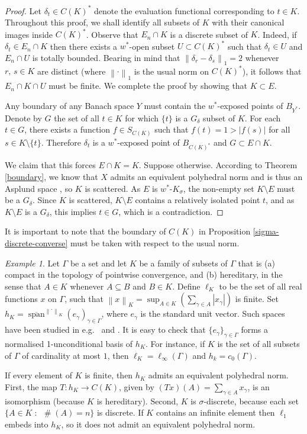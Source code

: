 \documentclass[12pt,a4paper]{amsart}
\theoremstyle{definition}
\theoremstyle{remark}
\newtheorem{example}[theorem]{Example}
\DeclareMathOperator{\card}{\#}
\DeclareMathOperator{\s}{span}
\newcommand{\cl}[1]{\ensuremath{\overline{{#1}}}}
\newcommand{\Ksig}{\ensuremath{K_\sigma}}
\newcommand{\n}[1]{\ensuremath{\left\|{#1}\right\|}}
\newcommand{\ndot}{\ensuremath{\left\|\cdot\right\|}}
\newcommand{\set}[2]{\{{#1} \;:\;\, {#2}\}}
\begin{document}
\begin{proof}
Let $\delta_t \in C(K)^*$ denote the evaluation functional corresponding
to $t \in K$. Throughout this proof, we shall identify all subsets of $K$
with their canonical images inside $C(K)^*$. Observe that $E_n \cap K$
is a discrete subset of $K$. Indeed, if $\delta_t \in E_n \cap K$ then there
exists a $w^*$-open subset $U \subset C(K)^*$ such that $\delta_t \in U$
and $E_n \cap U$ is totally bounded. Bearing in mind that $\n{\delta_r-\delta_s}_1 = 2$
whenever $r,\,s \in K$ are distinct (where $\ndot_1$ is the usual norm on $C(K)^*$),
it follows that $E_n \cap K \cap U$ must be finite. We complete the proof
by showing that $K \subset E$.

Any boundary of any Banach space $Y$ must contain the $w^*$-exposed
points of $B_{Y^*}$. Denote by $G$ the set of all $t \in K$ for
which $\{t\}$ is a $G_\delta$ subset of $K$. For each $t \in G$, there exists
a function $f \in S_{C(K)}$ such that $f(t)=1 > |f(s)|$ for all $s \in K\setminus\{t\}$.
Therefore $\delta_t$ is a $w^*$-exposed point of $B_{C(K)^*}$
and $G \subset E \cap K$.

We claim that this forces $E \cap K = K$. Suppose otherwise. According to
Theorem \ref{boundary}, we know that $X$ admits an equivalent
polyhedral norm and is thus an Asplund space \cite{fonf2}, so $K$ is scattered.
As $E$ is $w^*$-$\Ksig$, the non-empty set $K\setminus E$
must be a $G_\delta$. Since $K$ is scattered, $K\setminus E$ contains a
relatively isolated point $t$, and as $K\setminus E$ is a $G_\delta$, this
implies $t \in G$, which is a contradiction.
\end{proof}

It is important to note that the boundary of $C(K)$ in Proposition
\ref{sigma-discrete-converse} must be taken with respect to the usual norm.

\begin{example}
Let $\Gamma$ be a set and let $K$ be a family of subsets of $\Gamma$
that is (a) compact in the topology of pointwise convergence, and
(b) hereditary, in the sense that $A \in K$ whenever $A \subseteq B$
and $B \in K$. Define $\ell_K$ to be the set of all real functions
$x$ on $\Gamma$, such that $\n{x}_K = \sup_{A \in K}
\left(\sum_{\gamma \in A} |x_\gamma|\right)$ is finite. Set $h_K =
\cl{\s}^{\ndot_K}(e_\gamma)_{\gamma \in \Gamma}$, where $e_\gamma$
is the standard unit vector. Such spaces have been studied in e.g.\
\cite{am:93} and \cite{st:09}. It is easy to check that
$\{e_\gamma\}_{\gamma\in \Gamma}$ forms a normalised 1-unconditional
basis of $h_K$. For instance, if $K$ is the set of all subsets of
$\Gamma$ of cardinality at most $1$, then $\ell_K =
\ell_\infty(\Gamma)$ and $h_k = c_0(\Gamma)$.

If every element of $K$ is finite, then $h_K$ admits an equivalent
polyhedral norm. First, the map $T:h_K \to C(K)$, given by $(Tx)(A)
= \sum_{\gamma \in A} x_\gamma$, is an isomorphism (because $K$ is
hereditary). Second,  $K$ is $\sigma$-discrete, because each set
$\set{A \in K}{\card(A)=n}$ is discrete. If $K$ contains an infinite
element then $\ell_1$ embeds into $h_K$, so it does not admit an
equivalent polyhedral norm.
\end{example}
\end{document}
